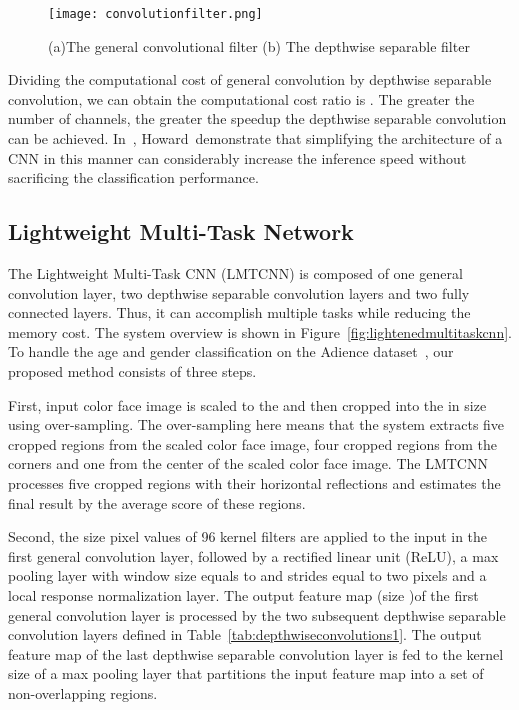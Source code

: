\documentclass[times, 10pt,twocolumn]{article}
\begin{document}
\begin{figure}
\centering
\texttt{[image: convolutionfilter.png]}
\caption{(a)The general convolutional filter (b) The depthwise separable filter}
\label{fig:convolutionfilter}
\end{figure}

Dividing the computational cost of general convolution by depthwise separable convolution, we can obtain the computational cost ratio is
. 
The greater the number of channels, the greater the speedup the depthwise separable convolution can be achieved.
In~\cite{howard2017mobilenets}, Howard~\etal demonstrate that simplifying the architecture of a CNN in this manner can considerably increase the inference speed without sacrificing the classification performance.



\subsection{Lightweight Multi-Task Network}

The Lightweight Multi-Task CNN (LMTCNN) is composed of one general convolution layer, two depthwise separable convolution layers and two fully connected layers. Thus, it can accomplish multiple tasks while reducing the memory cost. The system overview is shown in Figure~\ref{fig:lightenedmultitaskcnn}. To handle the age and gender classification on the Adience dataset~\cite{eidinger2014age}, our proposed method consists of three steps.

First, input color face image is scaled to the  and then cropped into the  in size using over-sampling. The over-sampling here means that the system extracts five cropped regions from the scaled color face image, four cropped regions from the corners and one from the center of the scaled color face image. The LMTCNN processes five cropped regions with their horizontal reflections and estimates the final result by the average score of these regions.

Second, the size  pixel values of 96 kernel filters are applied to the input in the first general convolution layer, followed by a rectified linear unit (ReLU), a max pooling layer with window size equals to  and strides equal to two pixels and a local response normalization layer. The output feature map (size )of the first general convolution layer is processed by the two subsequent depthwise separable convolution layers defined in Table~\ref{tab:depthwiseconvolutions1}. The output feature map of the last depthwise separable convolution layer is fed to the kernel size  of a max pooling layer that partitions the input feature map into a set of non-overlapping regions.
\end{document}
